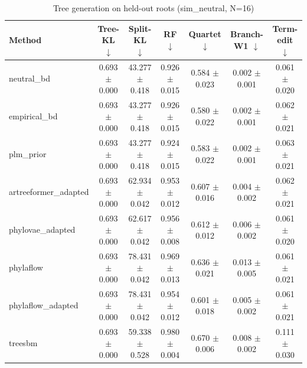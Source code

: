 \begin{table}[t]\centering
\caption{Tree generation on held-out roots (sim_neutral, N=16)}
\begin{tabular}{lcccccc}
\toprule
Method & Tree-KL $\downarrow$ & Split-KL $\downarrow$ & RF $\downarrow$ & Quartet $\downarrow$ & Branch-W1 $\downarrow$ & Term-edit $\downarrow$ \\
\midrule
neutral\_bd & 0.693 $\pm$ 0.000 & 43.277 $\pm$ 0.418 & 0.926 $\pm$ 0.015 & 0.584 $\pm$ 0.023 & 0.002 $\pm$ 0.001 & 0.061 $\pm$ 0.020 \\
empirical\_bd & 0.693 $\pm$ 0.000 & 43.277 $\pm$ 0.418 & 0.926 $\pm$ 0.015 & 0.580 $\pm$ 0.022 & 0.002 $\pm$ 0.001 & 0.062 $\pm$ 0.021 \\
plm\_prior & 0.693 $\pm$ 0.000 & 43.277 $\pm$ 0.418 & 0.924 $\pm$ 0.015 & 0.583 $\pm$ 0.022 & 0.002 $\pm$ 0.001 & 0.063 $\pm$ 0.021 \\
artreeformer\_adapted & 0.693 $\pm$ 0.000 & 62.934 $\pm$ 0.042 & 0.953 $\pm$ 0.012 & 0.607 $\pm$ 0.016 & 0.004 $\pm$ 0.002 & 0.062 $\pm$ 0.021 \\
phylovae\_adapted & 0.693 $\pm$ 0.000 & 62.617 $\pm$ 0.042 & 0.956 $\pm$ 0.008 & 0.612 $\pm$ 0.012 & 0.006 $\pm$ 0.002 & 0.061 $\pm$ 0.020 \\
phylaflow & 0.693 $\pm$ 0.000 & 78.431 $\pm$ 0.042 & 0.969 $\pm$ 0.013 & 0.636 $\pm$ 0.021 & 0.013 $\pm$ 0.005 & 0.061 $\pm$ 0.021 \\
phylaflow\_adapted & 0.693 $\pm$ 0.000 & 78.431 $\pm$ 0.042 & 0.954 $\pm$ 0.012 & 0.601 $\pm$ 0.018 & 0.005 $\pm$ 0.002 & 0.061 $\pm$ 0.021 \\
treesbm & 0.693 $\pm$ 0.000 & 59.338 $\pm$ 0.528 & 0.980 $\pm$ 0.004 & 0.670 $\pm$ 0.006 & 0.008 $\pm$ 0.002 & 0.111 $\pm$ 0.030 \\
\bottomrule
\end{tabular}
\end{table}